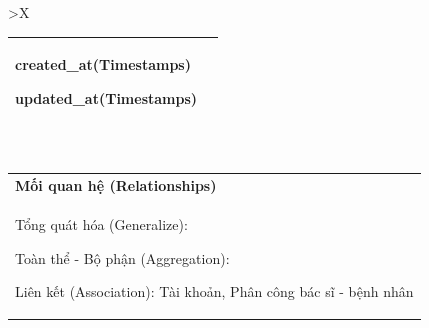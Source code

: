 \begin{xltabular}{\textwidth}{
   >{\centering\arraybackslash}X 
  }
\begin{tabularx}{0.9\textwidth}{|X|X|}
    created\_at(Timestamps)

    updated\_at(Timestamps)
    \\ \hline
  \end{tabularx}
  \\     
  \begin{tabularx}{0.9\textwidth}{|X|}
    \hline
   \textbf{Mối quan hệ (Relationships)} \\
    Tổng quát hóa (Generalize):  

    Toàn thể - Bộ phận (Aggregation):
    
    Liên kết (Association): Tài khoản, Phân công bác sĩ - bệnh nhân 
    \\
    \hline
  \end{tabularx}
  \end{xltabular}

